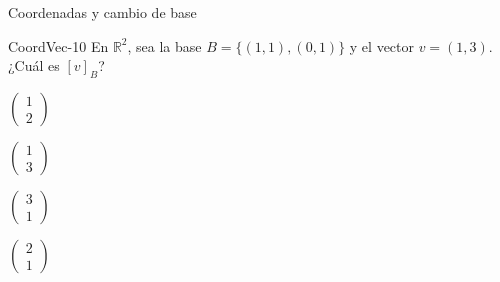 \documentclass[a4,11pt]{aleph-notas}
\begin{document}
\begin{quiz}{Coordenadas y cambio de base}
\begin{multi}[]%
    {CoordVec-10}
    En \(\mathbb{R}^2\), sea la base \(B=\{(1,1),(0,1)\}\) y el vector \(v=(1,3)\). ¿Cuál es \([v]_B\)?
    \item* \(\begin{pmatrix}1\\2\end{pmatrix}\)
    \item \(\begin{pmatrix}1\\3\end{pmatrix}\)
    \item \(\begin{pmatrix}3\\1\end{pmatrix}\)
    \item \(\begin{pmatrix}2\\1\end{pmatrix}\)
\end{multi}


\end{quiz}
\end{document}
